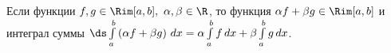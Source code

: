 
 	Если функции $f,g\in \Rim[a,b],\ \alpha,\beta\in\R$, то функция $\alpha f+\beta g\in\Rim[a,b]$ и интеграл суммы
 	$\ds\int\limits_a^b\left(\alpha f+\beta g\right)\,dx=\alpha\int\limits_a^bf\,dx+\beta\int\limits_a^bg\,dx$.
 